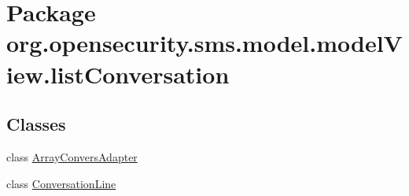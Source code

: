 \hypertarget{a00038}{\section{Package org.\+opensecurity.\+sms.\+model.\+model\+View.\+list\+Conversation}
\label{a00038}
}
\subsection*{Classes}
\begin{DoxyCompactItemize}
\item 
class \hyperlink{a00003}{Array\+Convers\+Adapter}
\item 
class \hyperlink{a00009}{Conversation\+Line}
\end{DoxyCompactItemize}
